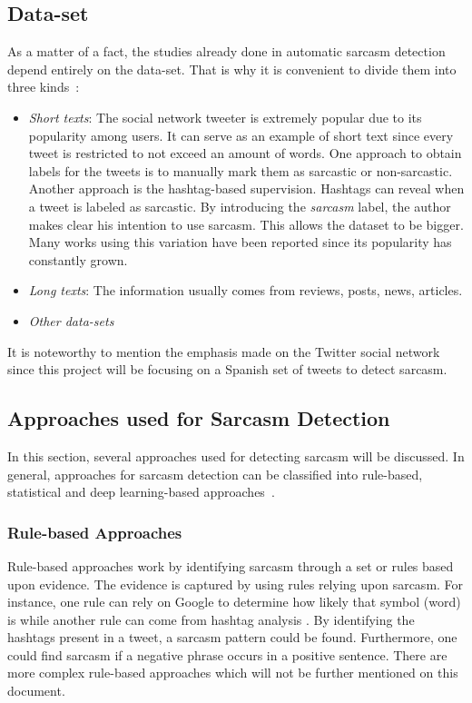 \subsection{Data-set}

As a matter of a fact, the studies already done in automatic sarcasm detection depend entirely on the data-set. That is why it is convenient to divide them into three kinds~\cite{joshi2017automatic}:
\begin{itemize}
	\item \textit{Short texts}: The social network tweeter is extremely popular due to its popularity among users. It can serve as an example of short text since every tweet is restricted to not exceed an amount of words. One approach to obtain labels for the tweets is to manually mark them as sarcastic or non-sarcastic. Another approach is the hashtag-based supervision. Hashtags can reveal when a tweet is labeled as sarcastic. By introducing the \textit{sarcasm} label, the author makes clear his intention to use sarcasm.  This allows the dataset to be bigger. Many works using this variation have been reported since its popularity has constantly grown.
	\item \textit{Long texts}: The information usually comes from reviews, posts, news, articles. 
	\item \textit{Other data-sets}
\end{itemize}

It is noteworthy to mention the emphasis made on the Twitter social network since this project will be focusing on a Spanish set of tweets to detect sarcasm. 

\subsection{Approaches used for Sarcasm Detection}
In this section, several approaches used for detecting sarcasm will be discussed. In general, approaches for sarcasm detection can be classified into rule-based, statistical and deep learning-based approaches~\cite{joshi2017automatic}.
\subsubsection{Rule-based Approaches~\cite{joshi2017automatic}}
Rule-based approaches work by identifying sarcasm through a set or rules based upon evidence. The evidence is captured by using rules relying upon sarcasm. For instance, one rule can rely on Google to determine how likely that symbol (word) is while another rule can come from hashtag analysis . By identifying the hashtags present in a tweet, a sarcasm pattern could be found. Furthermore, one could find sarcasm if a negative phrase occurs in a positive sentence. There are more complex rule-based approaches which will not be further mentioned on this document.
